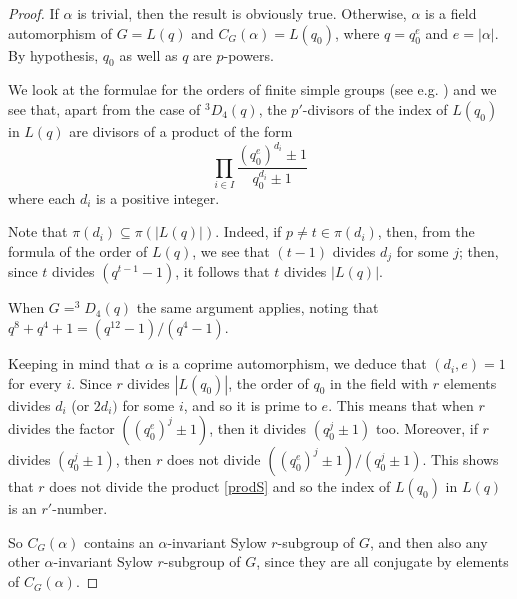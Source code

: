 \documentclass[12pt]{amsart}
\newcommand{\al }{\alpha }
\newcommand{\elp}{p}
\begin{document}
\begin{proof} 
If $\al$ is trivial, then the result is obviously true. Otherwise,  $\alpha$ is a field automorphism of $G = L(q)$ and $C_G(\alpha) = L(q_0)$, where $q=q_0^e$ and $e=|\al|$. 
 By hypothesis,  $q_0$ as well as $q$ are $\elp$-powers. 
 
 We look at the formulae for the orders of finite simple groups (see  e.g. \cite{Carter2}) and we see that, apart from the case of $^3D_4(q)$,  the $\elp'$-divisors of  the index of $ L(q_0)$ in  $L(q)$ are divisors of a product of the form
 \begin{equation}\label{prodS}
  \prod_{i \in I} \frac{ (q_0^e)^{d_i} \pm 1 }{ q_0^{d_i} \pm 1}
  \end{equation}
  where each $d_i$ is a positive integer. 
  
  Note that  $\pi(d_i) \subseteq \pi (|L(q)|)$. 
   Indeed, if $p \neq t \in \pi(d_i)$, then, from  the formula of the order of $L(q)$, we see that  $(t-1)$ divides $d_j$ for some $j$;
     then, since $t$ divides $(q^{t-1}-1)$, it follows that $t$ divides $|L(q)|$. 

 When $G=^3\!\!D_4(q)$ the same argument applies, noting that $q^8+q^4+1=(q^{12}-1)/(q^4-1)$.

Keeping in mind that $\al$ is a coprime automorphism, we deduce that $(d_i, e)=1$ for every $i$.  Since $r$ divides $|L(q_0)|$,  
 the order of   $q_0$ in the field with $r$ elements divides $d_i$ (or $2d_i)$ for some $i$, and so it is prime to $e$. 
   This means that when $r$ divides the factor $\left((q_0^e)^j \pm 1\right)$,  then it divides $(q_0^j \pm 1)$ too.  
   Moreover, if  $r$ divides $(q_0^j \pm 1)$, then 
  $r$  does not divide $\left((q_0^e)^j \pm 1\right)/(q_0^j \pm 1)$. 
  This shows that $r$ does not divide the product \eqref{prodS}
 and so  the index of $L(q_0)$ in $L(q)$ is an $r'$-number. 


So $C_G(\alpha)$ contains an $\alpha$-invariant Sylow $r$-subgroup of $G$, and then also 
 any other  $\alpha$-invariant Sylow $r$-subgroup of $G$, since they are all conjugate by  elements of $C_G(\alpha)$. 
 \end{proof}
\end{document}
